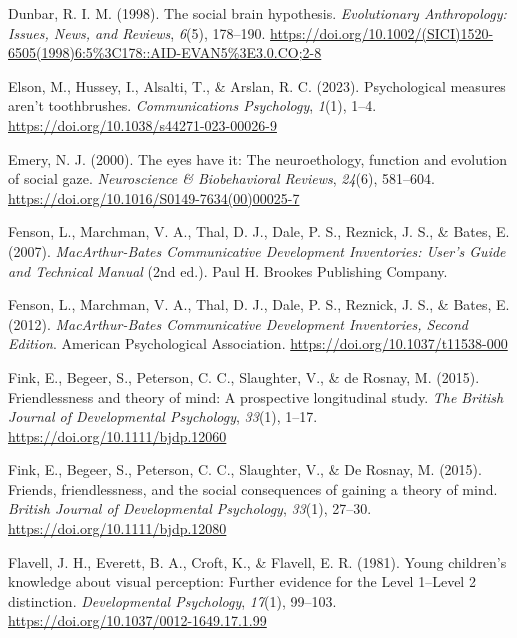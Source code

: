\documentclass[
]{scrbook}
\newlength{\cslhangindent}
\newenvironment{CSLReferences}[2] %
 {\begin{list}{}{%
  \setlength{\itemindent}{0pt}
  \setlength{\leftmargin}{0pt}
  \setlength{\parsep}{0pt}
  \ifodd #1
   \setlength{\leftmargin}{\cslhangindent}
   \setlength{\itemindent}{-1\cslhangindent}
  \fi
  \setlength{\itemsep}{#2\baselineskip}}}
 {\end{list}}
\begin{document}
\begin{CSLReferences}{1}{0}
Dunbar, R. I. M. (1998). The social brain hypothesis. \emph{Evolutionary Anthropology: Issues, News, and Reviews}, \emph{6}(5), 178--190. \url{https://doi.org/10.1002/(SICI)1520-6505(1998)6:5\%3C178::AID-EVAN5\%3E3.0.CO;2-8}

Elson, M., Hussey, I., Alsalti, T., \& Arslan, R. C. (2023). Psychological measures aren't toothbrushes. \emph{Communications Psychology}, \emph{1}(1), 1--4. \url{https://doi.org/10.1038/s44271-023-00026-9}

Emery, N. J. (2000). The eyes have it: The neuroethology, function and evolution of social gaze. \emph{Neuroscience \& Biobehavioral Reviews}, \emph{24}(6), 581--604. \url{https://doi.org/10.1016/S0149-7634(00)00025-7}

Fenson, L., Marchman, V. A., Thal, D. J., Dale, P. S., Reznick, J. S., \& Bates, E. (2007). \emph{{MacArthur-Bates Communicative Development Inventories}: {User}'s {Guide} and {Technical Manual}} (2nd ed.). Paul H. Brookes Publishing Company.

Fenson, L., Marchman, V. A., Thal, D. J., Dale, P. S., Reznick, J. S., \& Bates, E. (2012). \emph{{MacArthur-Bates Communicative Development Inventories}, {Second Edition}}. American Psychological Association. \url{https://doi.org/10.1037/t11538-000}

Fink, E., Begeer, S., Peterson, C. C., Slaughter, V., \& de Rosnay, M. (2015). Friendlessness and theory of mind: A prospective longitudinal study. \emph{The British Journal of Developmental Psychology}, \emph{33}(1), 1--17. \url{https://doi.org/10.1111/bjdp.12060}

Fink, E., Begeer, S., Peterson, C. C., Slaughter, V., \& De Rosnay, M. (2015). Friends, friendlessness, and the social consequences of gaining a theory of mind. \emph{British Journal of Developmental Psychology}, \emph{33}(1), 27--30. \url{https://doi.org/10.1111/bjdp.12080}

Flavell, J. H., Everett, B. A., Croft, K., \& Flavell, E. R. (1981). Young children's knowledge about visual perception: {Further} evidence for the {Level} 1--{Level} 2 distinction. \emph{Developmental Psychology}, \emph{17}(1), 99--103. \url{https://doi.org/10.1037/0012-1649.17.1.99}


\end{CSLReferences}
\end{document}
